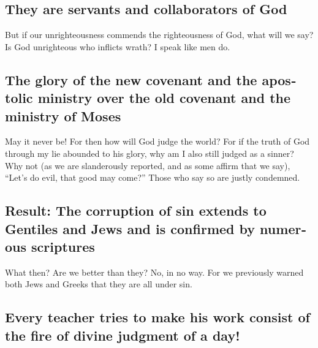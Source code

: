 \begin{paracol}{2}
\begin{otherlanguage}{english}
\hypertarget{they-are-servants-and-collaborators-of-god}{%
\subsection{They are servants and collaborators of
God}\label{they-are-servants-and-collaborators-of-god}}

 But if our unrighteousness commends the righteousness of
God, what will we say? Is God unrighteous who inflicts wrath? I speak
like men do.

\hypertarget{the-glory-of-the-new-covenant-and-the-apostolic-ministry-over-the-old-covenant-and-the-ministry-of-moses}{%
\subsection{The glory of the new covenant and the apostolic ministry
over the old covenant and the ministry of
Moses}\label{the-glory-of-the-new-covenant-and-the-apostolic-ministry-over-the-old-covenant-and-the-ministry-of-moses}}

 May it never be! For then how will God judge the world?
 For if the truth of God through my lie abounded to his
glory, why am I also still judged as a sinner?  Why not
(as we are slanderously reported, and as some affirm that we say),
``Let's do evil, that good may come?'' Those who say so are justly
condemned.

\hypertarget{result-the-corruption-of-sin-extends-to-gentiles-and-jews-and-is-confirmed-by-numerous-scriptures}{%
\subsection{Result: The corruption of sin extends to Gentiles and Jews
and is confirmed by numerous
scriptures}\label{result-the-corruption-of-sin-extends-to-gentiles-and-jews-and-is-confirmed-by-numerous-scriptures}}

 What then? Are we better than they? No, in no way. For we
previously warned both Jews and Greeks that they are all under sin.

\hypertarget{every-teacher-tries-to-make-his-work-consist-of-the-fire-of-divine-judgment-of-a-day}{%
\subsection{Every teacher tries to make his work consist of the fire of
divine judgment of a
day!}\label{every-teacher-tries-to-make-his-work-consist-of-the-fire-of-divine-judgment-of-a-day}}


\end{otherlanguage}
\end{paracol}
